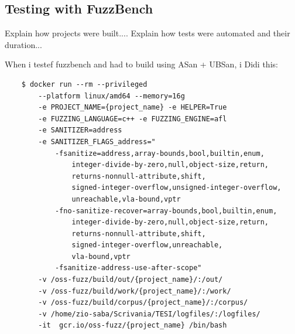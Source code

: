 \subsection{Testing with FuzzBench}
Explain how projects were built....
Explain how tests were automated and their duration...





When i testef fuzzbench and had to build using ASan + UBSan, i Didi this:
\begin{verbatim}
    $ docker run --rm --privileged 
        --platform linux/amd64 --memory=16g 
        -e PROJECT_NAME={project_name} -e HELPER=True 
        -e FUZZING_LANGUAGE=c++ -e FUZZING_ENGINE=afl 
        -e SANITIZER=address 
        -e SANITIZER_FLAGS_address="
            -fsanitize=address,array-bounds,bool,builtin,enum,
                integer-divide-by-zero,null,object-size,return,
                returns-nonnull-attribute,shift,
                signed-integer-overflow,unsigned-integer-overflow,
                unreachable,vla-bound,vptr
            -fno-sanitize-recover=array-bounds,bool,builtin,enum,
                integer-divide-by-zero,null,object-size,return,
                returns-nonnull-attribute,shift,
                signed-integer-overflow,unreachable,
                vla-bound,vptr 
            -fsanitize-address-use-after-scope" 
        -v /oss-fuzz/build/out/{project_name}/:/out/  
        -v /oss-fuzz/build/work/{project_name}/:/work/
        -v /oss-fuzz/build/corpus/{project_name}/:/corpus/
        -v /home/zio-saba/Scrivania/TESI/logfiles/:/logfiles/  
        -it  gcr.io/oss-fuzz/{project_name} /bin/bash
\end{verbatim}

